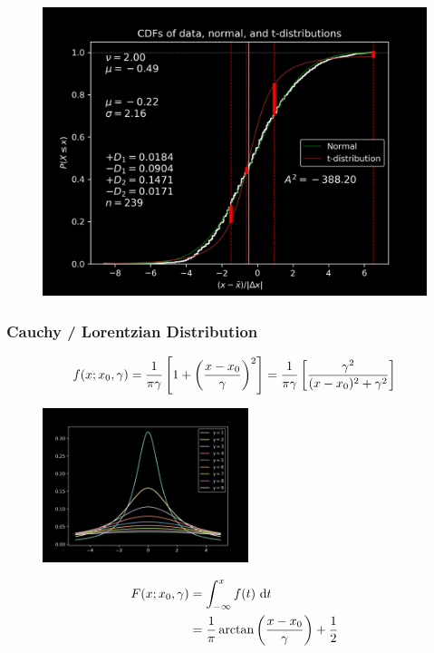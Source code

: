 \documentclass[9pt]{beamer}
\begin{document}
\begin{frame}
\begin{figure}[h]
\centering
\includegraphics[width=\textwidth]{t_cdf}
\label{fig:t_cdf}
\end{figure}
\end{frame}


\begin{frame}
\frametitle{Cauchy / Lorentzian Distribution}
\[
f(x; x_0, \gamma)
=\frac{1}{\pi\gamma}\left[1+\pqty{\frac{x-x_0}{\gamma}}^2\right]
=\frac{1}{\pi\gamma}\left[\frac{\gamma ^2}{(x-x_0)^2+\gamma ^2}
\right]
\]
\begin{figure}[h]
\centering
\includegraphics[width=6cm]{lo_dist}
\label{fig:lo_dist}
\end{figure}

\begin{equation*}
\begin{aligned}
F(x;x_0, \gamma) &=
\int _{-\infty}^x f(t)\ \dd t
\\&=\frac{1}{\pi}
\arctan\pqty{\frac{x-x_0}{\gamma}}+\frac12
\end{aligned}
\end{equation*}
\end{frame}
\end{document}
